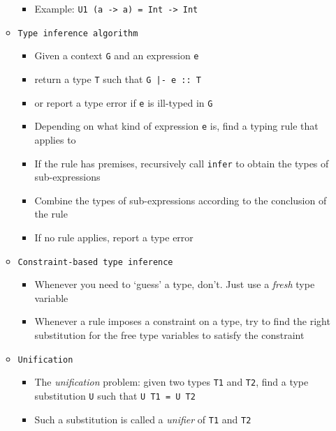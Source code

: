 \documentclass[landscape,8pt]{extarticle}
\newcommand{\code}{\lstinline}
\begin{document}
\begin{multicols}{3}
\begin{itemize}
\begin{itemize}
\begin{itemize}
                            \item Example: \code{U1 (a -> a) = Int -> Int}
                        \end{itemize}
                        \item \code{Type inference algorithm}
                        \begin{itemize}
                            \item Given a context \code{G} and an expression \code{e}
                            \item return a type \code{T} such that \code{G |- e :: T}
                            \item or report a type error if \code{e} is ill-typed in \code{G}
                            \item Depending on what kind of expression \code{e} is, find a typing rule that applies to
                            \item If the rule has premises, recursively call \code{infer} to obtain the types of sub-expressions
                            \item Combine the types of sub-expressions according to the conclusion of the rule
                            \item If no rule applies, report a type error
                        \end{itemize}
                        \item \code{Constraint-based type inference}
                        \begin{itemize}
                            \item Whenever you need to `guess' a type, don't. Just use a \emph{fresh} type variable
                            \item Whenever a rule imposes a constraint on a type, try to find the right substitution for the free type variables to satisfy the constraint
                        \end{itemize}
                        \item \code{Unification}
                        \begin{itemize}
                            \item The \emph{unification} problem: given two types \code{T1} and \code{T2}, find a type substitution \code{U} such that \code{U T1 = U T2}
                            \item Such a substitution is called a \emph{unifier} of \code{T1} and \code{T2}
                        \end{itemize}

\end{itemize}
\end{itemize}
\end{multicols}
\end{document}
